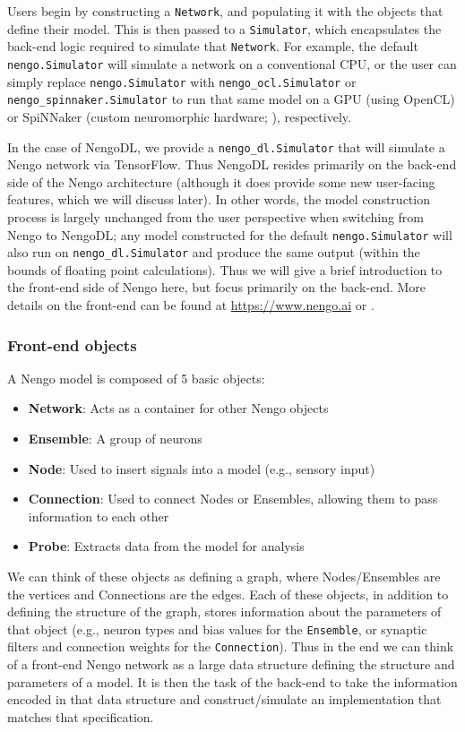 \documentclass{article}
\begin{document}

Users begin by constructing a \texttt{Network}, and populating it with the objects that define their model.  This is then passed to a \texttt{Simulator}, which encapsulates the back-end logic required to simulate that \texttt{Network}.  For example, the default \texttt{nengo.Simulator} will simulate a network on a conventional CPU, or the user can simply replace \texttt{nengo.Simulator} with \texttt{nengo\_ocl.Simulator} or \texttt{nengo\_spinnaker.Simulator} to run that same model on a GPU (using OpenCL) or SpiNNaker (custom neuromorphic hardware; \citealt{needcitation}), respectively.  

In the case of NengoDL, we provide a \texttt{nengo\_dl.Simulator} that will simulate a Nengo network via TensorFlow.  Thus NengoDL resides primarily on the back-end side of the Nengo architecture (although it does provide some new user-facing features, which we will discuss later).  In other words, the model construction process is largely unchanged from the user perspective when switching from Nengo to NengoDL; any model constructed for the default \texttt{nengo.Simulator} will also run on \texttt{nengo\_dl.Simulator} and produce the same output (within the bounds of floating point calculations).  Thus we will give a brief introduction to the front-end side of Nengo here, but focus primarily on the back-end.  More details on the front-end can be found at \url{https://www.nengo.ai} or \citet{Bekolay2014}.

\subsubsection{Front-end objects}

A Nengo model is composed of 5 basic objects:

\begin{itemize}
\item {\bf Network}: Acts as a container for other Nengo objects
\item {\bf Ensemble}: A group of neurons
\item {\bf Node}: Used to insert signals into a model (e.g., sensory input)
\item {\bf Connection}: Used to connect Nodes or Ensembles, allowing them to pass information to each other
\item {\bf Probe}: Extracts data from the model for analysis
\end{itemize}

We can think of these objects as defining a graph, where Nodes/Ensembles are the vertices and Connections are the edges.  Each of these objects, in addition to defining the structure of the graph, stores information about the parameters of that object (e.g., neuron types and bias values for the \texttt{Ensemble}, or synaptic filters and connection weights for the \texttt{Connection}).  Thus in the end we can think of a front-end Nengo network as a large data structure defining the structure and parameters of a model.  It is then the task of the back-end to take the information encoded in that data structure and construct/simulate an implementation that matches that specification.
\end{document}
